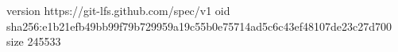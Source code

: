 version https://git-lfs.github.com/spec/v1
oid sha256:e1b21efb49bb99f79b729959a19c55b0e75714ad5c6c43ef48107de23c27d700
size 245533
